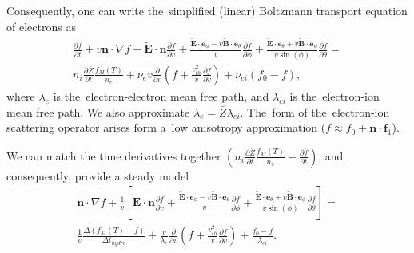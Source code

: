\documentclass[preprint,12pt]{elsarticle}
\newcommand{\pdv}[2]{\frac{\partial{#1}}{\partial{#2}}}
\newcommand{\vect}[1]{\boldsymbol{#1}}
\newcommand{\mfpe}{\lambda_e}
\newcommand{\mfpei}{\lambda_{ei}}
\newcommand{\Zbar}{\bar{Z}}
\newcommand{\nue}{\nu_{e}}
\newcommand{\nuei}{\nu_{ei}}
\newcommand{\vmag}{v}
\newcommand{\vth}{v_{th}}
\newcommand{\vn}{\vect{n}}
\newcommand{\tE}{\vect{\tilde{E}}}
\newcommand{\tB}{\vect{\tilde{B}}}
\newcommand{\fM}{f_M}
\newcommand{\fzero}{f_0}
\newcommand{\fone}{\vect{f}_1}
\newcounter{bla}
\begin{document}
Consequently, one can write the~simplified (linear) Boltzmann transport 
equation of electrons as
\begin{multline}
  \pdv{f}{t} +
  \vmag\vn\cdot\nabla f + \tE\cdot\vn \pdv{f}{\vmag} 
  + \frac{\tE\cdot\vect{e}_\phi 
  - \vmag\tB\cdot\vect{e}_\theta}{\vmag}\pdv{f}{\phi}
  + \frac{\tE\cdot\vect{e}_\theta + \vmag\tB\cdot\vect{e}_\phi}
  {\vmag\sin(\phi)}\pdv{f}{\theta}
  =\\
  n_i \pdv{\Zbar}{t}\frac{\fM(T)}{n_e} +
  \nue\vmag\pdv{}{\vmag}\left( f + 
  \frac{\vth^2}{\vmag} \pdv{f}{\vmag}\right) 
  + \nuei\left(\fzero - f\right) ,
  \label{eq:DECO_spherical}
\end{multline}
where $\mfpe$ is the~electron-electron mean free path, and
$\mfpei$ is the~electron-ion mean free path. We also approximate
$\mfpe = \Zbar \mfpei$. The~form of the~electron-ion scattering operator
arises form a~low anisotropy approximation 
($f\approx\fzero + \vn\cdot\fone$).

We can match the time derivatives together
$\left(n_i \pdv{\Zbar}{t}\frac{\fM(T)}{n_e} - \pdv{f}{t}\right)$, 
and consequently, provide a steady model
\begin{multline}
  \vn\cdot\nabla f + \frac{1}{\vmag}\left[\tE\cdot\vn \pdv{f}{\vmag} 
  + \frac{\tE\cdot\vect{e}_\phi 
  - \vmag\tB\cdot\vect{e}_\theta}{\vmag}\pdv{f}{\phi}
  + \frac{\tE\cdot\vect{e}_\theta + \vmag\tB\cdot\vect{e}_\phi}
  {\vmag\sin(\phi)}\pdv{f}{\theta}\right]
  =\\
  \frac{1}{\vmag}\frac{\Delta\left(\fM(T) - f\right)}{\Delta t_{hydro}} +
  \frac{\vmag}{\mfpe}\pdv{}{\vmag}\left( f + 
  \frac{\vth^2}{\vmag} \pdv{f}{\vmag}\right) 
  + \frac{\fzero - f}{\mfpei} .
  \label{eq:DECO_spherical}
\end{multline}













\end{document}
